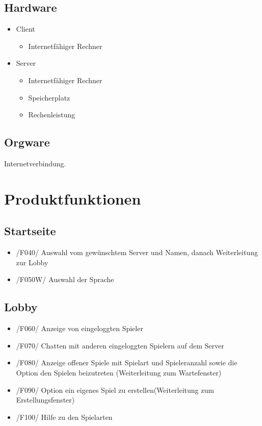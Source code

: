 \documentclass{article}
\begin{document}
\subsection{Hardware}
\begin{itemize}
		\item \gls{Client}
		\begin{itemize}
			\item Internetfähiger Rechner
		\end{itemize}
		\item Server
		\begin{itemize}
			\item Internetfähiger Rechner	
			\item Speicherplatz
			\item Rechenleistung
		\end{itemize}
	\end{itemize}

\subsection{Orgware}
Internetverbindung.

\section{Produktfunktionen}
\subsection{Startseite}
\begin{itemize}
	\item /F040/ Auswahl vom gewünschtem \gls{Server} und Namen, danach Weiterleitung zur \gls{Lobby}
	\item /F050W/ Auswahl der Sprache
\end{itemize}

\subsection{\gls{Lobby}}
\begin{itemize}
	\item /F060/ Anzeige von eingeloggten Spieler
	\item /F070/ Chatten mit anderen eingeloggten Spielern auf dem \gls{Server}
	\item /F080/ Anzeige offener Spiele mit Spielart und Spieleranzahl sowie die Option den Spielen beizutreten (Weiterleitung zum Wartefenster)
	\item /F090/ Option ein eigenes Spiel zu erstellen(Weiterleitung zum Erstellungsfenster)
	\item /F100/ Hilfe zu den Spielarten
\end{itemize}
\end{document}
